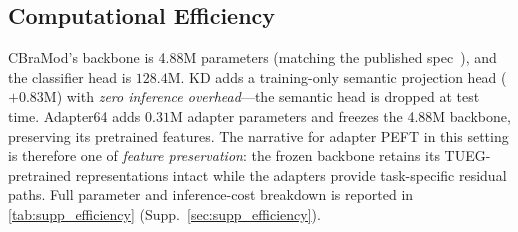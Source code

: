 \subsection{Computational Efficiency}
\label{sec:efficiency}
\vspace{-1mm}

CBraMod's backbone is 4.88M parameters (matching the published spec~\cite{wang2025cbramod}), and the classifier head is $128.4$M. KD adds a training-only semantic projection head ($+0.83$M) with \emph{zero inference overhead}---the semantic head is dropped at test time. Adapter64 adds $0.31$M adapter parameters and freezes the 4.88M backbone, preserving its pretrained features. The narrative for adapter PEFT in this setting is therefore one of \emph{feature preservation}: the frozen backbone retains its TUEG-pretrained representations intact while the adapters provide task-specific residual paths. Full parameter and inference-cost breakdown is reported in \cref{tab:supp_efficiency} (Supp.~\cref{sec:supp_efficiency}).
